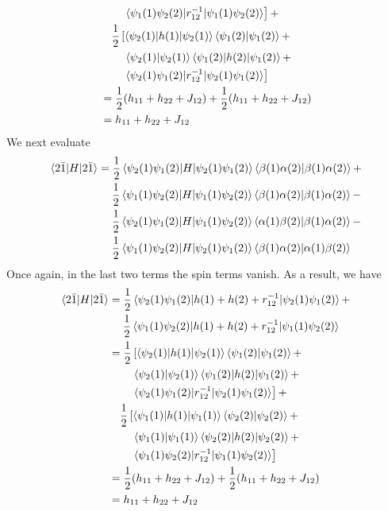 \begin{enumerate}
\[\begin{aligned}
&\quad\quad\left.\braket{\psi_1(1)\psi_2(2)|r_{12}^{-1}|\psi_1(1)\psi_2(2)}
\right] + \\
&\quad\frac{1}{2}\left[\braket{\psi_2(1)|h(1)|\psi_2(1)}\braket{\psi_1(2)|\psi_1(2)}
+ \right. \\
&\quad\quad\left.\braket{\psi_2(1)|\psi_2(1)}\braket{\psi_1(2)|h(2)|\psi_1(2)}
+ \right. \\
&\quad\quad\left.\braket{\psi_2(1)\psi_1(2)|r_{12}^{-1}|\psi_2(1)\psi_1(2)}
\right] \\
&= \frac{1}{2}(h_{11} + h_{22} + J_{12}) + \frac{1}{2}(h_{11} + h_{22} + J_{12}) \\
&= h_{11} + h_{22} + J_{12}
\end{aligned}
\]
We next evaluate
\[
\begin{aligned}
\braket{2\bar{1}|H|2\bar{1}} &= 
\frac{1}{2}\braket{\psi_2(1)\psi_1(2)|H|\psi_2(1)\psi_1(2)}
           \braket{\beta(1)\alpha(2)|\beta(1)\alpha(2)} + \\
&\quad\;\frac{1}{2}\braket{\psi_1(1)\psi_2(2)|H|\psi_1(1)\psi_2(2)}
           \braket{\beta(1)\alpha(2)|\beta(1)\alpha(2)} - \\
&\quad\;\frac{1}{2}\braket{\psi_2(1)\psi_1(2)|H|\psi_1(1)\psi_2(2)}
           \braket{\alpha(1)\beta(2)|\beta(1)\alpha(2)} - \\
&\quad\;\frac{1}{2}\braket{\psi_1(1)\psi_2(2)|H|\psi_2(1)\psi_1(2)}
           \braket{\beta(1)\alpha(2)|\alpha(1)\beta(2)} 
\end{aligned}
\]
Once again, in the last two terms the spin terms vanish. As a result, we have
\[
\begin{aligned}
\braket{2\bar{1}|H|2\bar{1}} &= 
\frac{1}{2}\braket{\psi_2(1)\psi_1(2)|h(1)+h(2)+r_{12}^{-1}|\psi_2(1)\psi_1(2)}
 + \\
&\quad\;\frac{1}{2}\braket{\psi_1(1)\psi_2(2)|h(1)+h(2)+r_{12}^{-1}|
\psi_1(1)\psi_2(2)} \\
&=\frac{1}{2}\left[\braket{\psi_2(1)|h(1)|\psi_2(1)}\braket{\psi_1(2)|\psi_1(2)}
+ \right. \\
&\quad\quad\left.\braket{\psi_2(1)|\psi_2(1)}\braket{\psi_1(2)|h(2)|\psi_1(2)}
+ \right. \\
&\quad\quad\left.\braket{\psi_2(1)\psi_1(2)|r_{12}^{-1}|\psi_2(1)\psi_1(2)}
\right] + \\
&\quad\frac{1}{2}\left[\braket{\psi_1(1)|h(1)|\psi_1(1)}\braket{\psi_2(2)|\psi_2(2)}
+ \right. \\
&\quad\quad\left.\braket{\psi_1(1)|\psi_1(1)}\braket{\psi_2(2)|h(2)|\psi_2(2)}
+ \right. \\
&\quad\quad\left.\braket{\psi_1(1)\psi_2(2)|r_{12}^{-1}|\psi_1(1)\psi_2(2)}
\right] \\
&= \frac{1}{2}(h_{11} + h_{22} + J_{12}) + \frac{1}{2}(h_{11} + h_{22} + J_{12}) \\
&= h_{11} + h_{22} + J_{12}
\end{aligned}
\]


\end{enumerate}
